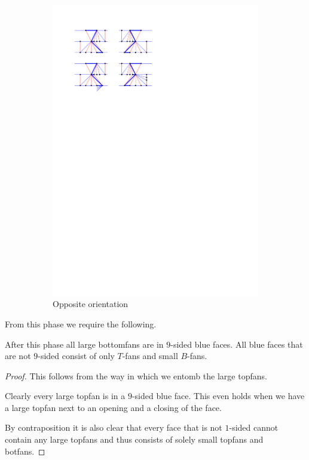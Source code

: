 \begin{figure}
\begin{subfigure}[b]{0.45 \textwidth}
          \includegraphics[width =\textwidth]{unifiedAlgo/img/post/oppChain}
          \caption{Opposite orientation}
      \end{subfigure}
      \caption{}
      \label{fig:uni:chains}
    \end{figure}

  From this phase we require the following.
  \begin{lemma}
    \label{lm:}
    After this phase all large bottomfans are in $9$-sided blue faces. All blue faces that are not $9$-sided consist of only $T$-fans and small $B$-fans.
  \end{lemma}
  \begin{proof}
    This follows from the way in which we entomb the large topfans.

    Clearly every large topfan is in a $9$-sided blue face. This even holds when we have a large topfan next to an opening and a closing of the face.

     By contraposition it is also clear that every face that is not $1$-sided cannot contain any large topfans and  thus consists of solely small topfans and botfans.
  \end{proof}


